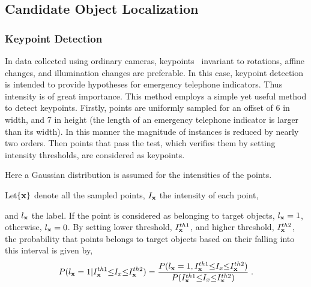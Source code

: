 \subsection{Candidate Object Localization}
\subsubsection{Keypoint Detection}

In data collected using ordinary cameras, keypoints~\citep{o2,o12} invariant to rotations, affine changes, and illumination changes are preferable. In this case, keypoint detection is intended to provide hypotheses for emergency telephone indicators. Thus intensity is of great importance. This method employs a simple yet useful method to detect keypoints. Firstly, points are uniformly sampled for an offset of 6 in width, and 7 in height (the length of an emergency telephone indicator is larger than its width). In this manner the magnitude of instances is reduced by nearly two orders. Then points that pass the test, which verifies them by setting intensity thresholds, are considered as keypoints.

Here a Gaussian distribution is assumed for the intensities of the points.




Let$\{\bf{x}\}$ denote all the sampled points, $I_{\bf{x}}$ the intensity of each point, 
and $l_{\bf{x}}$ the label. If the point is considered as belonging to target objects, $l_{\bf{x}}=1$, otherwise, $l_{\bf{x}}=0$. By setting lower threshold, $I^{th1}_{\bf{x}}$,  and higher threshold, $I^{th2}_{\bf{x}}$, the probability that points belongs to target objects based on their falling into this interval is given by,
\begin{equation}
P(l_{\bf{x}}=1|I^{th1}_{\bf{x}}{\leq}I_x{\leq}{I^{th2}_{\bf{x}}})=
\frac
{P(l_{\bf{x}}=1,I^{th1}_{\bf{x}}{\leq}I_x{\leq}{I^{th2}_{\bf{x}}})} {P(I^{th1}_{\bf{x}}{\leq}I_x{\leq}{I^{th2}_{\bf{x}}})}\;.
\label{eq1}
\end{equation}



